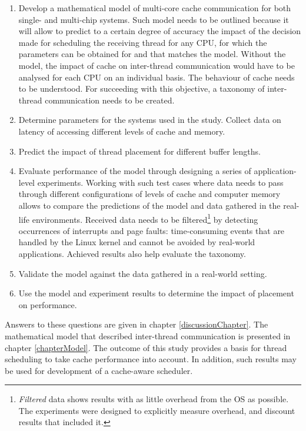 \begin{enumerate}
  \item Develop a mathematical model of multi-core cache communication for both single- and multi-chip systems. Such model needs to be outlined because it will allow to predict to a certain degree of accuracy the impact of the decision made for scheduling the receiving thread for any CPU, for which the parameters can be obtained for and that matches the model. Without the model, the impact of cache on inter-thread communication would have to be analysed for each CPU on an individual basis. The behaviour of cache needs to be understood. For succeeding with this objective, a taxonomy of inter-thread communication needs to be created.
   \item Determine parameters for the systems used in the study. Collect data on latency of accessing different levels of cache and memory.
   \item Predict the impact of thread placement for different buffer lengths.
   \item Evaluate performance of the model through designing a series of application-level experiments. Working with such test cases where data needs to pass through different configurations of levels of cache and computer memory allows to compare the predictions of the model and data gathered in the real-life environments. Received data needs to be filtered\footnote{\textit{Filtered} data shows results with as little overhead from the OS as possible. The experiments were designed to explicitly measure overhead, and discount results that included it.} by detecting occurrences of interrupts and page faults: time-consuming events that are handled by the Linux kernel and cannot be avoided by real-world applications. Achieved results also help evaluate the taxonomy.
  \item Validate the model against the data gathered in a real-world setting.
  \item Use the model and experiment results to determine the impact of placement on performance.
\end{enumerate}

Answers to these questions are given in chapter \ref{discussionChapter}. The mathematical model that described inter-thread communication is presented in chapter \ref{chapterModel}. The outcome of this study provides a basis for thread scheduling to take cache performance into account. In addition, such results may be used for development of a cache-aware scheduler.

